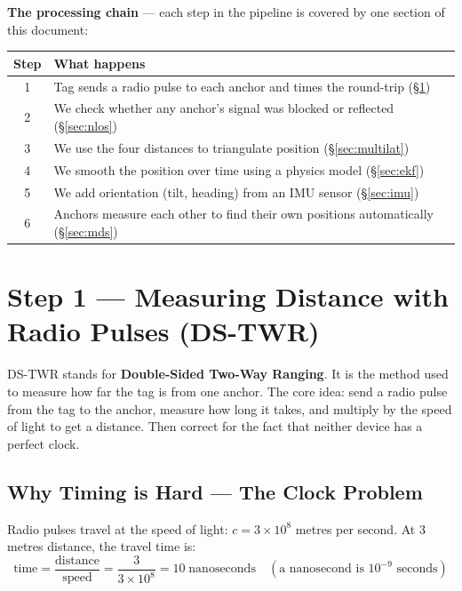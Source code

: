 \documentclass[11pt,a4paper]{article}
\begin{document}
\textbf{The processing chain} --- each step in the pipeline is covered by one section of this document:

\bigskip
\begin{center}
\begin{tabular}{cl}
\toprule
\textbf{Step} & \textbf{What happens} \\
\midrule
1 & Tag sends a radio pulse to each anchor and times the round-trip (\S\ref{sec:dstwr}) \\
2 & We check whether any anchor's signal was blocked or reflected (\S\ref{sec:nlos}) \\
3 & We use the four distances to triangulate position (\S\ref{sec:multilat}) \\
4 & We smooth the position over time using a physics model (\S\ref{sec:ekf}) \\
5 & We add orientation (tilt, heading) from an IMU sensor (\S\ref{sec:imu}) \\
6 & Anchors measure each other to find their own positions automatically (\S\ref{sec:mds}) \\
\bottomrule
\end{tabular}
\end{center}

\section{Step 1 --- Measuring Distance with Radio Pulses (DS-TWR)}
\label{sec:dstwr}

\begin{plain}
DS-TWR stands for \textbf{Double-Sided Two-Way Ranging}. It is the method used to measure how far the tag is from one anchor. The core idea: send a radio pulse from the tag to the anchor, measure how long it takes, and multiply by the speed of light to get a distance. Then correct for the fact that neither device has a perfect clock.
\end{plain}

\subsection{Why Timing is Hard --- The Clock Problem}

Radio pulses travel at the speed of light: $c = 3 \times 10^8$ metres per second. At 3 metres distance, the travel time is:
\[
\text{time} = \frac{\text{distance}}{\text{speed}} = \frac{3}{3\times10^8} = 10\;\text{nanoseconds}
\quad(\text{a nanosecond is } 10^{-9}\text{ seconds})
\]
\end{document}
